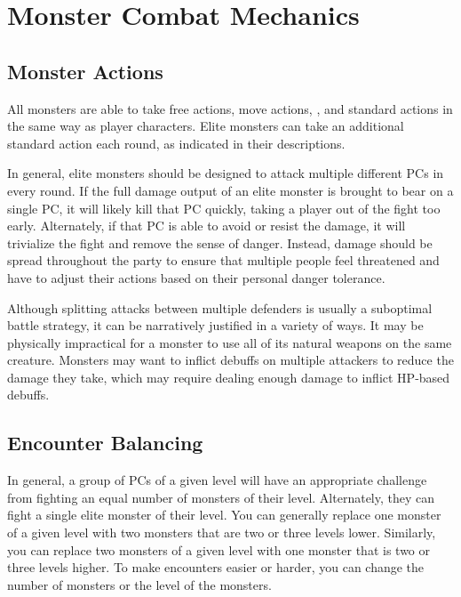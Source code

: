 \section{Monster Combat Mechanics}

    \subsection{Monster Actions}\label{Monster Actions}
        All monsters are able to take free actions, move actions, , and standard actions in the same way as player characters.
        Elite monsters can take an additional standard action each round, as indicated in their descriptions.

        In general, elite monsters should be designed to attack multiple different PCs in every round.
        If the full damage output of an elite monster is brought to bear on a single PC, it will likely kill that PC quickly, taking a player out of the fight too early.
        Alternately, if that PC is able to avoid or resist the damage, it will trivialize the fight and remove the sense of danger.
        Instead, damage should be spread throughout the party to ensure that multiple people feel threatened and have to adjust their actions based on their personal danger tolerance.

        Although splitting attacks between multiple defenders is usually a suboptimal battle strategy, it can be narratively justified in a variety of ways.
        It may be physically impractical for a monster to use all of its natural weapons on the same creature.
        Monsters may want to inflict debuffs on multiple attackers to reduce the damage they take, which may require dealing enough damage to inflict HP-based debuffs.

    \subsection{Encounter Balancing}\label{Encounter Balancing}
        In general, a group of PCs of a given level will have an appropriate challenge from fighting an equal number of monsters of their level.
        Alternately, they can fight a single elite monster of their level.
        You can generally replace one monster of a given level with two monsters that are two or three levels lower.
        Similarly, you can replace two monsters of a given level with one monster that is two or three levels higher.
        To make encounters easier or harder, you can change the number of monsters or the level of the monsters.

